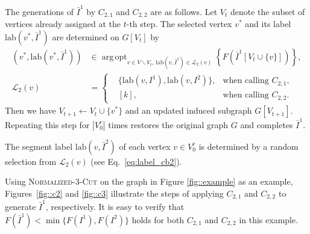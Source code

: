 \documentclass[12pt, a4paper]{article}%
\DeclareMathOperator*{\argopt}{\ensuremath{arg\,opt}}
\newcommand{\labeling}{\ensuremath{\mathrm{lab}}}
\numberwithin{equation}{section}
\theoremstyle{plain}
\begin{document}
The generations of $\bar{I}^1$ by $C_{2,1}$ and $C_{2,2}$ are as follows.  Let $V_t$ denote the subset of vertices already assigned at the $t$-th step. The selected vertex $v^*$ and its label $\labeling(v^*,\bar{I}^1)$ are determined on $G[V_t]$ by
\begin{align}
\left(v^*,\labeling(v^*,\bar{I}^1)\right) &\in \argopt_{v\in V\backslash V_t,\,\labeling(v,\bar{I}^1)\in \mathcal{L}_2(v)}\left\{F(\bar{I}^1[V_t\cup\{v\}])\right\}, \\
\mathcal{L}_2(v) &=\left\{
\begin{aligned}
	&	\{\labeling(v,I^1),\labeling(v,I^2)\},& \text{when calling }C_{2,1},\\
	&[k], &\text{when calling }C_{2,2}.
\end{aligned}
\right. \label{eq:label_cb2}
\end{align}
Then we have $V_{t+1}\leftarrow V_t\cup\{v^*\}$ and an updated induced subgraph $G[V_{t+1}]$. Repeating this step for $|V_0^c|$ times restores the original graph $G$ and completes $\bar{I}^1$. 

The segment label $\labeling(v,\bar{I}^2)$ of each vertex $v\in V_0^c$ is determined by a random selection from $\mathcal{L}_2(v)$ (see Eq.~\eqref{eq:label_cb2}). 

Using 	\textsc{Normalized}-$3$-\textsc{Cut} on the graph in Figure \ref{fig::example} as an example, Figures~\ref{fig::c2} and \ref{fig::c3} illustrate the steps of applying $C_{2,1}$ and $C_{2,2}$ to generate $\bar{I}^1$, respectively. It is easy to verify that  $F(\bar{I}^1)<\min\{F(I^1),F(I^2)\}$ holds for both $C_{2,1}$ and $C_{2,2}$ in this example.
\end{document}
